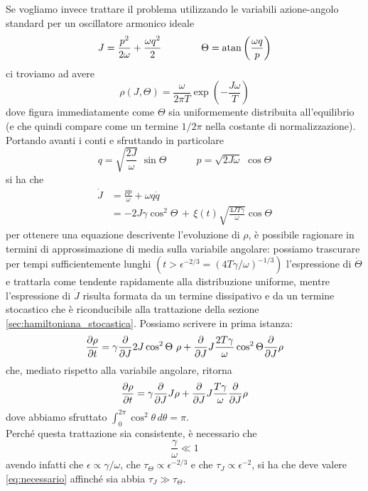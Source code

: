 \documentclass[10pt,a4paper]{article}
\begin{document}
Se vogliamo invece trattare il problema utilizzando le variabili azione-angolo standard per un oscillatore armonico ideale
\begin{equation}
	J = \frac{p^2}{2\omega} + \frac{\omega q^2}{2} \quad\quad\quad\quad \Theta = \atan\left(\frac{\omega q}{p}\right)
\end{equation}
ci troviamo ad avere
\begin{equation}
	\rho(J, \Theta) = \frac{\omega}{2\pi T} \exp\left(-\frac{J\omega}{T}\right)
\end{equation}
dove figura immediatamente come $\Theta$ sia uniformemente distribuita all'equilibrio (e che quindi compare come un termine $1/2\pi$ nella costante di normalizzazione).\\
Portando avanti i conti e sfruttando in particolare
\begin{equation}
	q = \sqrt{\frac{2J}{\omega}}\,\,\sin{\Theta} \quad\quad\quad p = \sqrt{2J\omega}\,\,\cos{\Theta}
\end{equation}
si ha che
\begin{align}
	\dot{J} &= \frac{p\dot{p}}{\omega} + \omega q\dot{q}\\
	&= -2J\gamma \cos^2\Theta \,+\, \xi(t)\sqrt{\frac{4JT\gamma}{\omega}}\cos\Theta
\end{align}
per ottenere una equazione descrivente l'evoluzione di $\rho$, è possibile ragionare in termini di approssimazione di media sulla variabile angolare: possiamo trascurare per tempi sufficientemente lunghi $(t > \epsilon^{-2/3} = (4T\gamma/\omega)^{-1/3})$ l'espressione di $\dot{\Theta}$ e trattarla come tendente rapidamente alla distribuzione uniforme, mentre l'espressione di $\dot{J}$ risulta formata da un termine dissipativo e da un termine stocastico che è riconducibile alla trattazione della sezione \ref{sec:hamiltoniana_stocastica}. Possiamo scrivere in prima istanza:
\begin{equation}
	\pdv{\rho}{t} = \gamma \pdv{}{J} 2J\cos^2\Theta\,\,\rho + \pdv{}{J} J\frac{2T\gamma}{\omega}\cos^2\Theta \pdv{}{J} \rho
\end{equation} 
che, mediato rispetto alla variabile angolare, ritorna
\begin{equation}
	\pdv{\rho}{t} = \gamma \pdv{}{J} J\rho + \pdv{}{J} J\frac{T\gamma}{\omega} \pdv{}{J} \rho
	\label{eq:pendolo_fokker_planck_1}
\end{equation}
dove abbiamo sfruttato $\int_0^{2\pi}\cos^2\theta\, d\theta = \pi$.\\
Perché questa trattazione sia consistente, è necessario che
\begin{equation}
	\frac{\gamma}{\omega} \ll 1
	\label{eq:necessario}
\end{equation}
avendo infatti che $\epsilon \propto \gamma/\omega$, che $\tau_\Theta \propto \epsilon^{-2/3}$ e che $\tau_J \propto \epsilon^{-2}$, si ha che deve valere \eqref{eq:necessario} affinché sia abbia $\tau_J \gg \tau_\Theta$. 
\end{document}
